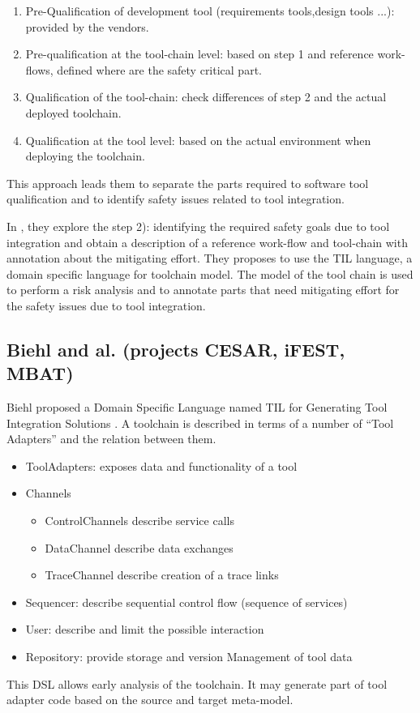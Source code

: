 \begin{enumerate}
\item Pre-Qualification of development tool (requirements tools,design
  tools ...): provided by the vendors.
\item Pre-qualification at the tool-chain level: based on step 1 and
  reference work-flows, defined where are the safety critical part.
\item Qualification of the tool-chain: check differences of step 2 and
  the actual deployed toolchain.
\item Qualification at the tool level: based on the actual environment
  when deploying the toolchain.
\end{enumerate}
This approach leads them to separate the parts required to software tool
qualification and to identify safety issues related to tool integration.

In \cite{asplund_towards_2012}, they explore the step 2): identifying
the required safety goals due to tool integration and obtain a
description of a reference work-flow and tool-chain with annotation
about the mitigating effort.  They proposes to use the TIL language, a
domain specific language for toolchain model.  The model of the tool
chain is used to perform a risk analysis and to annotate parts
that need mitigating effort for the safety issues due to tool
integration. 

\subsection{Biehl and al. (projects CESAR, iFEST, MBAT)}
\label{sec-1-2.3}

Biehl proposed a Domain Specific Language named TIL for Generating Tool Integration
Solutions \cite{biehl_matthias_domain_2011}.  A toolchain is described in terms
of a number of ``Tool Adapters'' and the relation between them.
\begin{itemize}
\item ToolAdapters: exposes data and functionality of a tool
\item Channels
  \begin{itemize}
  \item ControlChannels describe service calls
  \item DataChannel describe data exchanges
  \item TraceChannel  describe creation of a trace links
  \end{itemize}

\item Sequencer: describe sequential control flow (sequence of services)
\item User:  describe and limit the possible interaction
\item Repository:  provide storage and version Management of tool data
\end{itemize}
This DSL allows early analysis of the toolchain.
It may generate part of tool adapter code based on the source and target
meta-model.


